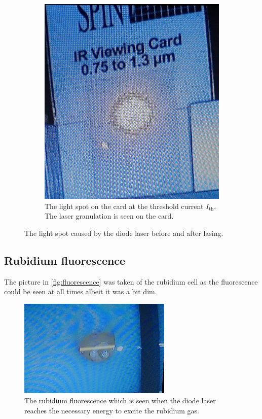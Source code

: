 \begin{figure}[ht]
    \hfill
    \begin{subfigure}{0.49\textwidth}
        \includegraphics[width=\textwidth]{bilder/laser_after.jpg}
        \caption{The light spot on the card at the threshold current $I_\text{th}$. The laser granulation is seen on the card. \cite{anleitungHeNe}}
        \label{fig:laser_after}
    \end{subfigure}
    \caption{The light spot caused by the diode laser before and after lasing.}
\end{figure}

\FloatBarrier

\subsection{Rubidium fluorescence}
The picture in \autoref{fig:fluorescence} was taken of the rubidium cell as the fluorescence could be seen at all times albeit it was a bit dim.
\begin{figure}[ht]
    \center
    \includegraphics[width=0.65\textwidth]{bilder/fluorescence.jpg}
    \caption{The rubidium fluorescence which is seen when the diode laser reaches the necessary energy to excite the rubidium gas. \cite{anleitungHeNe}}
    \label{fig:fluorescence}
\end{figure}

